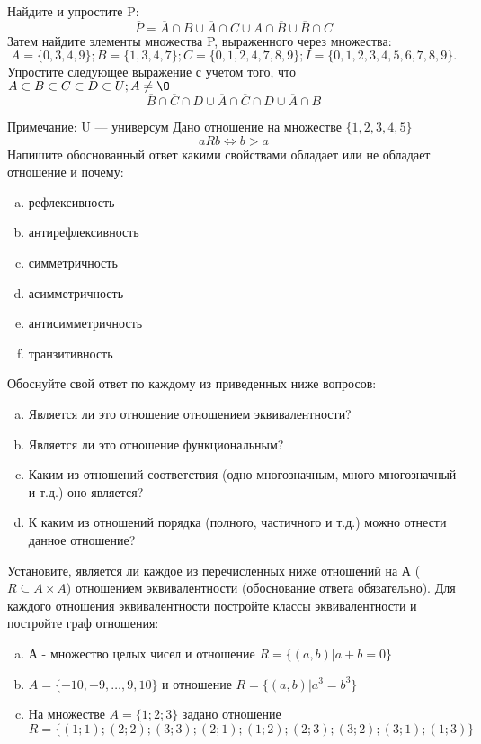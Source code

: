 \documentclass[10pt]{exam}
\begin{document}
\begin{questions}
\question
Найдите и упростите P:
\begin{equation*}
\overline{P} = \overline{A} \cap B \cup \overline{A} \cap C \cup A \cap \overline{B} \cup \overline{B} \cap C
\end{equation*}
Затем найдите элементы множества P, выраженного через множества:
\begin{equation*}
A = \{0, 3, 4, 9\}; 
B = \{1, 3, 4, 7\};
C = \{0, 1, 2, 4, 7, 8, 9\};
I = \{0, 1, 2, 3, 4, 5, 6, 7, 8, 9\}.
\end{equation*}\question
Упростите следующее выражение с учетом того, что $A\subset B \subset C \subset D \subset U; A \neq \O$
\begin{equation*}
\overline{B} \cap \overline{C} \cap D \cup \overline{A} \cap \overline{C} \cap D \cup \overline{A} \cap B
\end{equation*}

Примечание: U — универсум\question
Дано отношение на множестве $\{1, 2, 3, 4, 5\}$ 
\begin{equation*}
aRb \iff b > a
\end{equation*}
Напишите обоснованный ответ какими свойствами обладает или не обладает отношение и почему:   
\begin{enumerate} [a)]\setcounter{enumi}{0}
\item рефлексивность
\item антирефлексивность
\item симметричность
\item асимметричность
\item антисимметричность
\item транзитивность
\end{enumerate}

Обоснуйте свой ответ по каждому из приведенных ниже вопросов:
\begin{enumerate} [a)]\setcounter{enumi}{0}
    \item Является ли это отношение отношением эквивалентности?
    \item Является ли это отношение функциональным?
    \item Каким из отношений соответствия (одно-многозначным, много-многозначный и т.д.) оно является?
    \item К каким из отношений порядка (полного, частичного и т.д.) можно отнести данное отношение?
\end{enumerate}

\question
Установите, является ли каждое из перечисленных ниже отношений на А ($R \subseteq A \times A$) отношением эквивалентности (обоснование ответа обязательно). Для каждого отношения эквивалентности 
постройте классы эквивалентности и постройте граф отношения:
\begin{enumerate}[a)]\setcounter{enumi}{0}
\item А - множество целых чисел и отношение $R = \{(a,b)|a + b = 0\}$
\item $A = \{-10, -9, …, 9, 10\}$ и отношение $R = \{(a,b)|a^{3} = b^{3}\}$
\item На множестве $A = \{1; 2; 3\}$ задано отношение $R = \{(1; 1); (2; 2); (3; 3); (2; 1); (1; 2); (2; 3); (3; 2); (3; 1); (1; 3)\}$


\end{enumerate}
\end{questions}
\end{document}
